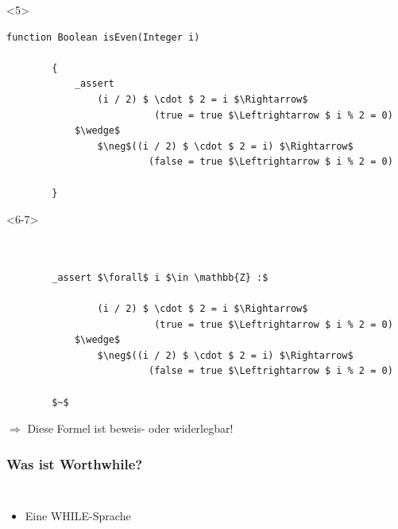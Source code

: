 \documentclass[t,svgnames]{beamer}
\begin{document}
\begin{frame}[fragile]
		\begin{onlyenv}<5>
	\begin{lstlisting}[frame=lines,mathescape=true]
		function Boolean isEven(Integer i)
		
		{
		    _assert
		        (i / 2) $ \cdot $ 2 = i $\Rightarrow$
		                  (true = true $\Leftrightarrow $ i % 2 = 0)
		    $\wedge$    	
		        $\neg$((i / 2) $ \cdot $ 2 = i) $\Rightarrow$
		                 (false = true $\Leftrightarrow $ i % 2 = 0)
		        	
		}
	\end{lstlisting}
	\end{onlyenv}
	
	
		\begin{onlyenv}
	\begin{lstlisting}[frame=lines,mathescape=true]
	
		        
		_assert $\forall$ i $\in \mathbb{Z} :$	  
		    
		        (i / 2) $ \cdot $ 2 = i $\Rightarrow$
		                  (true = true $\Leftrightarrow $ i % 2 = 0)
		    $\wedge$    	
		        $\neg$((i / 2) $ \cdot $ 2 = i) $\Rightarrow$
		                 (false = true $\Leftrightarrow $ i % 2 = 0)
		        	
		$~$
	\end{lstlisting}
	\end{onlyenv}
	
	\vspace{1cm}
	
	 {
		$\Rightarrow$ Diese Formel ist beweis- oder widerlegbar!
	}
\end{frame}

\begin{frame}
	\frametitle{Was ist Worthwhile?}

	\begin{columns}[c]
			\begin{itemize}
			\item Eine WHILE-Sprache
			\end{itemize}
	\end{columns}
\end{frame}

\lstset{
   basicstyle=\scriptsize\ttfamily
}
\end{document}
